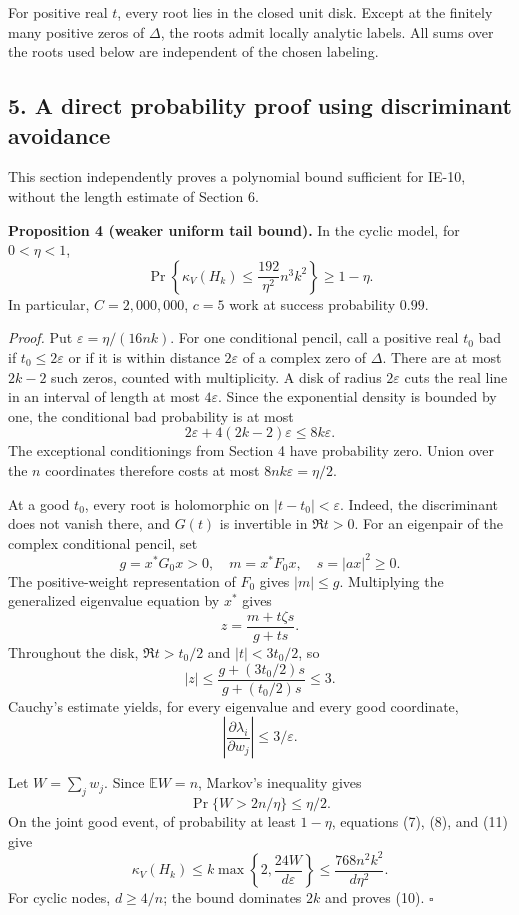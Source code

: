 \documentclass[
  11pt,
]{article}
\begin{document}
For positive real \(t\), every root lies in the closed unit disk. Except
at the finitely many positive zeros of \(\Delta\), the roots admit
locally analytic labels. All sums over the roots used below are
independent of the chosen labeling.

\subsection{5. A direct probability proof using discriminant
avoidance}\label{a-direct-probability-proof-using-discriminant-avoidance}

This section independently proves a polynomial bound sufficient for
IE-10, without the length estimate of Section 6.

\textbf{Proposition 4 (weaker uniform tail bound).} In the cyclic model,
for \(0<\eta<1\), \[
\Pr\left\{\kappa_V(H_k)\leq\frac{192}{\eta^2}n^3k^2\right\}\geq1-\eta. \tag{10}
\] In particular, \(C=2{,}000{,}000\), \(c=5\) work at success
probability \(0.99\).

\emph{Proof.} Put \(\varepsilon=\eta/(16nk)\). For one conditional
pencil, call a positive real \(t_0\) bad if \(t_0\leq2\varepsilon\) or
if it is within distance \(2\varepsilon\) of a complex zero of
\(\Delta\). There are at most \(2k-2\) such zeros, counted with
multiplicity. A disk of radius \(2\varepsilon\) cuts the real line in an
interval of length at most \(4\varepsilon\). Since the exponential
density is bounded by one, the conditional bad probability is at most \[
2\varepsilon+4(2k-2)\varepsilon\leq8k\varepsilon.
\] The exceptional conditionings from Section 4 have probability zero.
Union over the \(n\) coordinates therefore costs at most
\(8nk\varepsilon=\eta/2\).

At a good \(t_0\), every root is holomorphic on \(|t-t_0|<\varepsilon\).
Indeed, the discriminant does not vanish there, and \(G(t)\) is
invertible in \(\Re t>0\). For an eigenpair of the complex conditional
pencil, set \[
g=x^*G_0x>0,\quad m=x^*F_0x,\quad s=|ax|^2\geq0.
\] The positive-weight representation of \(F_0\) gives \(|m|\leq g\).
Multiplying the generalized eigenvalue equation by \(x^*\) gives \[
z=\frac{m+t\zeta s}{g+ts}.
\] Throughout the disk, \(\Re t>t_0/2\) and \(|t|<3t_0/2\), so \[
|z|\leq\frac{g+(3t_0/2)s}{g+(t_0/2)s}\leq3.
\] Cauchy's estimate yields, for every eigenvalue and every good
coordinate, \[
\left|\frac{\partial\lambda_i}{\partial w_j}\right|\leq3/\varepsilon. \tag{11}
\]

Let \(W=\sum_jw_j\). Since \(\mathbb EW=n\), Markov's inequality gives
\[
\Pr\{W>2n/\eta\}\leq\eta/2.
\] On the joint good event, of probability at least \(1-\eta\),
equations (7), (8), and (11) give \[
\kappa_V(H_k)
\leq k\max\left\{2,\frac{24W}{d\varepsilon}\right\}
\leq\frac{768n^2k^2}{d\eta^2}.
\] For cyclic nodes, \(d\geq4/n\); the bound dominates \(2k\) and proves
(10). \(\square\)
\end{document}
